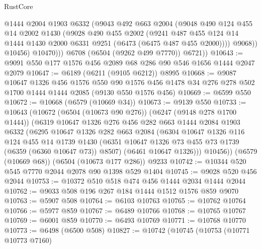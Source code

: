 \begin{lexlean}{RustCore}
\begin{coremodule}
                @1444
                @2004
                @1903
                @6332
                (@9043
                  @492
                  @663
                  @2004
                  (@9048
                    @490
                    @124
                    @455
                    @14
                    @2002
                    @1430
                    (@9028
                      @490
                      @455
                      @2002
                      (@9241
                        @487
                        @455
                        @124
                        @14
                        @1444
                        @1430
                        @2000
                        @6331
                        @9251
                        (@6473 (@6475 @487 @455 @2000))))
                    @9068))
                @10456)
              @10470)))
        @6708
        (@6504 (@9262 @499 @7770))
        @6721))
@10643 := @9091 @550 @177 @1576 @456 @2089 @68 @286 @90 @546 @1656 @1444 @2047 @2079
@10647 := @6189 (@6211 (@9105 @6212)) @8995
@10668 := @9087
    @10647
    @1326
    @456
    @1576
    @550
    @90
    @1576
    @456
    @1478
    @34
    @276
    @278
    @502
    @1700
    @1444
    @1444
    @2085
    (@9130 @550 @1576 @456)
@10669 := @6599 @550
@10672 := @10668 (@6579 (@10669 @34))
@10673 := @9139 @550
@10733 := @10643
    (@10672
      (@6504 (@10673 @90 @276))
      (@6247 (@9148 @278 @1700 @1444))
      (@6319
        @10647
        @1326
        @276
        @456
        @282
        @663
        @1444
        @2084
        @1903
        @6332
        (@6295
          @10647
          @1326
          @282
          @663
          @2084
          (@6304
            @10647
            @1326
            @116
            @124
            @455
            @14
            @1739
            @1430
            (@6351 @10647 @1326 @73 @455 @73 @1739 (@6359 (@6360 @10647 @73)) @8507)
            (@6461 @10647 @1326)))
        @10456))
    (@6579 (@10669 @68))
    (@6504 (@10673 @177 @286))
    @9233
@10742 := @10344 @520 @545 @7770 @2044 @2078 @90 @1398 @529 @1404
@10745 := @9028 @520 @456 @2044
@10753 := @10372 @510 @518 @474 @456 @1444 @2034 @1444 @2044
@10762 := @9033 @508 @196 @267 @184 @1444 @1512 @1576 @859 @9070
@10763 := @5907 @508
@10764 := @6103 @10763
@10765 := @10762 @10764
@10766 := @5977 @859
@10767 := @6489 @10766
@10768 := @10765 @10767
@10769 := @6001 @859
@10770 := @6493 @10769
@10771 := @10768 @10770
@10773 := @6498 (@6500 @508)
@10827 := @10742
    (@10745
      (@10753
        (@10771 @10773 @7160)

\end{coremodule}
\end{lexlean}
